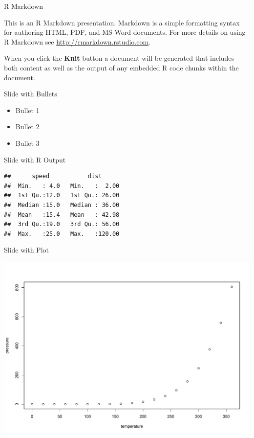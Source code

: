 \begin{frame}{R Markdown}

This is an R Markdown presentation. Markdown is a simple formatting
syntax for authoring HTML, PDF, and MS Word documents. For more details
on using R Markdown see \url{http://rmarkdown.rstudio.com}.

When you click the \textbf{Knit} button a document will be generated
that includes both content as well as the output of any embedded R code
chunks within the document.

\end{frame}

\begin{frame}{Slide with Bullets}

\begin{itemize}
\tightlist
\item
  Bullet 1
\item
  Bullet 2
\item
  Bullet 3
\end{itemize}

\end{frame}

\begin{frame}[fragile]{Slide with R Output}

\begin{Shaded}
\begin{Highlighting}[]
\end{Highlighting}
\end{Shaded}

\begin{verbatim}
##      speed           dist       
##  Min.   : 4.0   Min.   :  2.00  
##  1st Qu.:12.0   1st Qu.: 26.00  
##  Median :15.0   Median : 36.00  
##  Mean   :15.4   Mean   : 42.98  
##  3rd Qu.:19.0   3rd Qu.: 56.00  
##  Max.   :25.0   Max.   :120.00
\end{verbatim}

\end{frame}

\begin{frame}{Slide with Plot}

\includegraphics{Test2_files/figure-beamer/pressure-1.pdf}

\end{frame}

